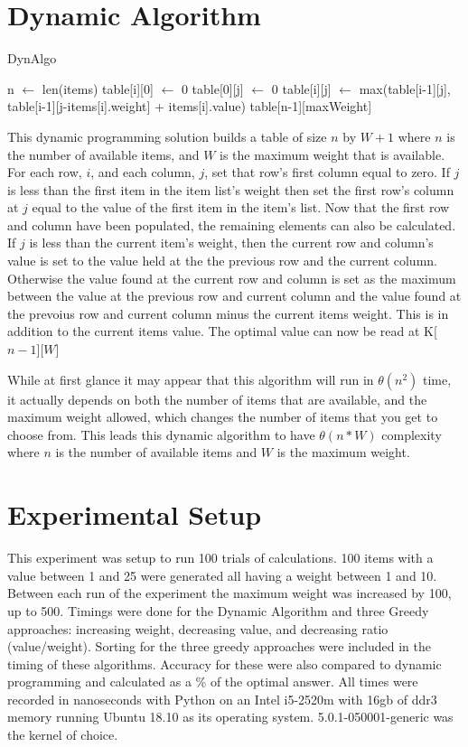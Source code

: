 \documentclass[10pt, letterpaper]{article}
\begin{document}
\section{Dynamic Algorithm}
\begin{algorithm}
	\begin{algorithmic}
		\caption{DynAlgo}\label{DynAlgo}
		\State n $\gets$ len(items)
				\State table[i][0] $\gets$ 0
					\State table[0][j] $\gets$ 0
				\EndIf
					\State table[i][j] $\gets$ max(table[i-1][j], table[i-1][j-items[i].weight] + items[i].value)
				\EndIf
			\EndFor
		\EndFor
		\Return table[n-1][maxWeight]
		\EndFunction
	\end{algorithmic}
\end{algorithm}

This dynamic programming solution builds a table of size $n$ by $W+1$ where $n$ is the number of available items, and $W$ is the maximum weight that is available. For each row, $i$, and each column, $j$,  set that row's first column equal to zero. If $j$ is less than the first item in the item list's weight then set the first row's column at $j$ equal to the value of the first item in the item's list.
Now that the first row and column have been populated, the remaining elements can also be calculated.
If $j$ is less than the current item's weight, then the current row and column's value is set to the value held at the the previous row and the current column. Otherwise the value found at the current row and column is set as the maximum between the value at the previous row and current column and the value found at the prevoius row and current column minus the current items weight. This is in addition to the current items value. The optimal value can now be read at K[$n-1$][$W$]


\medskip
While at first glance it may appear that this algorithm will run in $\theta(n^2)$ time, it actually depends on both the number of items that are available, and the maximum weight allowed, which changes the number of items that you get to choose from. This leads this dynamic algorithm to have $\theta(n * W)$ complexity where $n$ is the number of available items and $W$ is the maximum weight.
\section{Experimental Setup}
This experiment was setup to run 100 trials of calculations. 100 items with a value between 1 and 25 were generated all having a weight between 1 and 10. Between each run of the experiment the maximum weight was increased by 100, up to 500. Timings were done for the Dynamic Algorithm and three Greedy approaches: increasing weight, decreasing value, and decreasing ratio (value/weight). Sorting for the three greedy approaches were included in the timing of these algorithms. Accuracy for these were also compared to dynamic programming and calculated as a \% of the optimal answer. All times were recorded in nanoseconds with Python on an Intel i5-2520m with 16gb of ddr3 memory running Ubuntu 18.10 as its operating system. 5.0.1-050001-generic was the kernel of choice.
\end{document}

